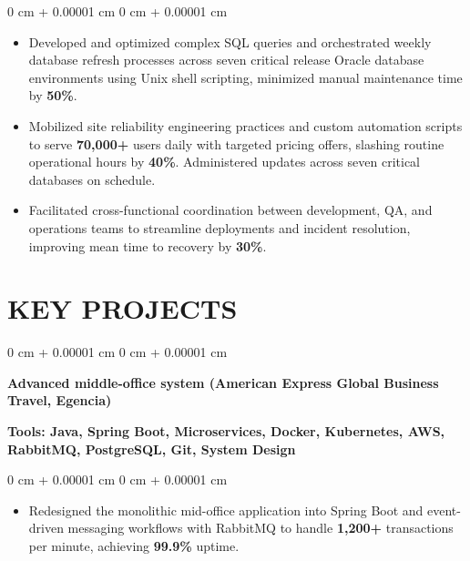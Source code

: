 \documentclass[10pt, letterpaper]{article}
\newenvironment{highlights}{
    \begin{itemize}[
        topsep=0.10 cm,
        parsep=0.10 cm,
        partopsep=0pt,
        itemsep=0pt,
        leftmargin=0 cm + 10pt
    ]
}{
    \end{itemize}
} %
\newenvironment{onecolentry}{
    \begin{adjustwidth}{
        0 cm + 0.00001 cm
    }{
        0 cm + 0.00001 cm
    }
}{
    \end{adjustwidth}
} %
\begin{document}
        \vspace{0.10 cm}
        \begin{onecolentry}
            \begin{highlights}
                \item Developed and optimized complex SQL queries and orchestrated weekly database refresh processes across seven critical release Oracle database environments using Unix shell scripting, minimized manual maintenance time by \textbf{50\%}.
                
                \item Mobilized site reliability engineering practices and custom automation scripts to serve \textbf{70,000+} users daily with targeted pricing offers, slashing routine operational hours by \textbf{40\%}. Administered updates across seven critical databases on schedule.

                
                \item Facilitated cross-functional coordination between development, QA, and operations teams to streamline deployments and incident resolution, improving mean time to recovery by \textbf{30\%}.
            \end{highlights}
        \end{onecolentry}
    
    \vspace{0.1 cm}
    \section{KEY PROJECTS}
    \vspace{0.1 cm}
        \begin{onecolentry}
            \textbf{Advanced middle-office system (American Express Global Business Travel, Egencia)}
        \end{onecolentry}
        \textbf{Tools: Java, Spring Boot, Microservices, Docker, Kubernetes, AWS, RabbitMQ, PostgreSQL, Git, System Design}

        \vspace{0.10 cm}
        \begin{onecolentry}
            \begin{highlights}
                \item Redesigned the monolithic mid-office application into Spring Boot and event-driven messaging workflows with RabbitMQ to handle \textbf{1,200+} transactions per minute, achieving \textbf{99.9\%} uptime.
            \end{highlights}
        \end{onecolentry}
\end{document}
